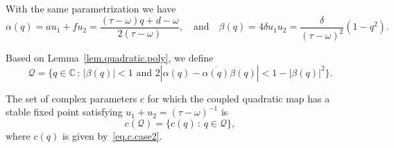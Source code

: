 \documentclass[10pt]{article}
\begin{document}
\begin{description}
With the same parametrization we have
\[
\alpha(q) = a u_1 + f u_2
          = \frac{(\tau-\omega) q + d - \omega}{2 (\tau - \omega)},
\quad \text{and} \quad
\beta(q) = 4\delta u_1 u_2
         = \frac{\delta}{(\tau - \omega)^2} (1 - q^2).
\]

Based on Lemma~\ref{lem.quadratic.poly}, we define
\[
\mathcal{Q} = \biggl\{
    q \in \mathbb{C}\,:\,
    |\beta(q)| < 1 \text{ and }
    2 |\alpha(q) - \overline{\alpha(q)} \beta(q)| < 1 - |\beta(q)|^{2}
\biggr\}.
\]

The set of complex parameters $c$ for which the coupled quadratic map has a
stable fixed point satisfying $u_{1} + u_{2}=(\tau-\omega)^{-1}$ is
\[
c(\mathcal{Q}) = \bigl\{c(q)\,:\, q \in \mathcal{Q}\bigr\},
\]
where $c(q)$ is given by~\eqref{eq.c.case2}.
\end{description}



\end{document}
